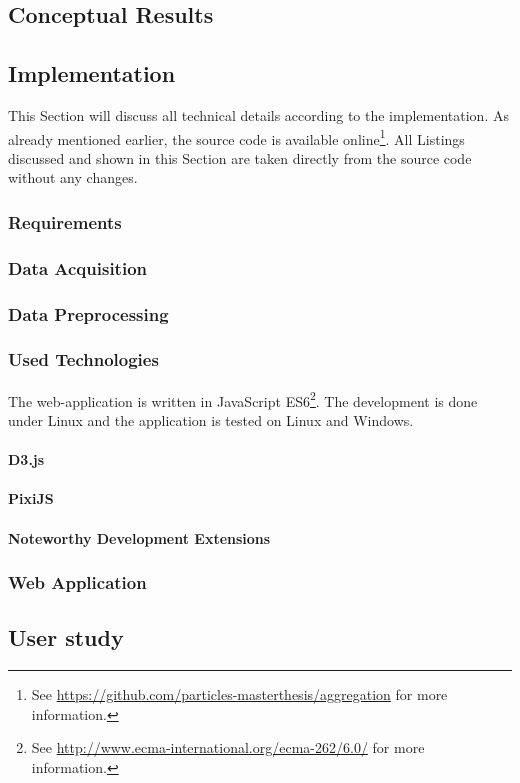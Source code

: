 \subsection{Conceptual Results}


\subsection{Implementation}
\cbstart
This Section will discuss all technical details according to the implementation.
As already mentioned earlier, the source code is available online\footnote{See \href{https://github.com/particles-masterthesis/aggregation}{https://github.com/particles-masterthesis/aggregation} for more information.}. All Listings discussed and shown in this Section are taken directly from the source code without any changes.
\cbend

\subsubsection{Requirements}


\subsubsection{Data Acquisition}
\label{s:data-acquisition}


\subsubsection{Data Preprocessing}
\label{s:data-preprocessing}


\subsubsection{Used Technologies}
The web-application is written in JavaScript ES6\footnote{See \href{http://www.ecma-international.org/ecma-262/6.0/}{http://www.ecma-international.org/ecma-262/6.0/} for more information.}. The development is done under Linux and the application is tested on Linux and Windows.

\paragraph{D3.js}


\paragraph{PixiJS}


\paragraph{Noteworthy Development Extensions}


\subsubsection{Web Application}
\label{s:web-application}


\subsection{User study}

